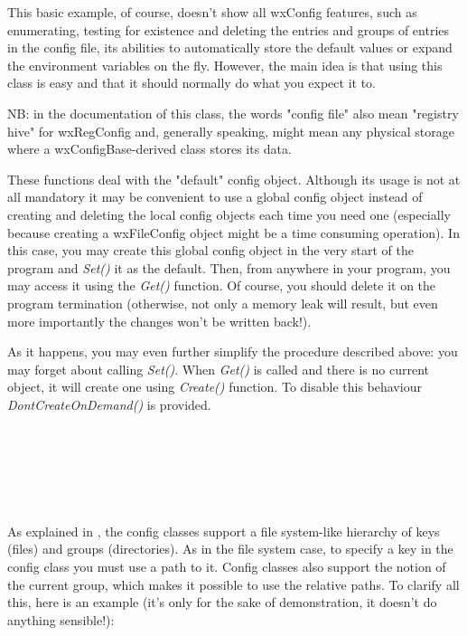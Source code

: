 This basic example, of course, doesn't show all wxConfig features, such as
enumerating, testing for existence and deleting the entries and groups of
entries in the config file, its abilities to automatically store the default
values or expand the environment variables on the fly. However, the main idea
is that using this class is easy and that it should normally do what you
expect it to.

NB: in the documentation of this class, the words "config file" also mean
"registry hive" for wxRegConfig and, generally speaking, might mean any
physical storage where a wxConfigBase-derived class stores its data.



These functions deal with the "default" config object. Although its usage is
not at all mandatory it may be convenient to use a global config object
instead of creating and deleting the local config objects each time you need
one (especially because creating a wxFileConfig object might be a time
consuming operation). In this case, you may create this global config object
in the very start of the program and {\it Set()} it as the default. Then, from
anywhere in your program, you may access it using the {\it Get()} function. Of
course, you should delete it on the program termination (otherwise, not only a
memory leak will result, but even more importantly the changes won't be
written back!).

As it happens, you may even further simplify the procedure described above:
you may forget about calling {\it Set()}. When {\it Get()} is called and there
is no current object, it will create one using {\it Create()} function. To
disable this behaviour {\it DontCreateOnDemand()} is provided.

\\
\\
\\


\\


As explained in , the config classes
support a file system-like hierarchy of keys (files) and groups (directories).
As in the file system case, to specify a key in the config class you must use
a path to it. Config classes also support the notion of the current group,
which makes it possible to use the relative paths. To clarify all this, here
is an example (it's only for the sake of demonstration, it doesn't do anything
sensible!):

